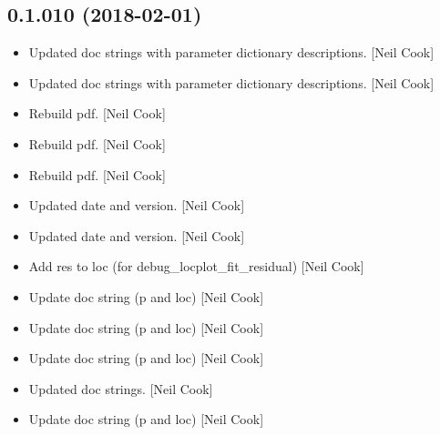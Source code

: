 \documentclass[a4paper,10pt,english]{report}
\begin{document}
\subsection{0.1.010 (2018-02-01)}
\label{\detokenize{misc/changelog:id492}}\begin{itemize}
\item {} 
Updated doc strings with parameter dictionary descriptions. {[}Neil
Cook{]}

\item {} 
Updated doc strings with parameter dictionary descriptions. {[}Neil
Cook{]}

\item {} 
Rebuild pdf. {[}Neil Cook{]}

\item {} 
Rebuild pdf. {[}Neil Cook{]}

\item {} 
Rebuild pdf. {[}Neil Cook{]}

\item {} 
Updated date and version. {[}Neil Cook{]}

\item {} 
Updated date and version. {[}Neil Cook{]}

\item {} 
Add res to loc (for debug\_locplot\_fit\_residual) {[}Neil Cook{]}

\item {} 
Update doc string (p and loc) {[}Neil Cook{]}

\item {} 
Update doc string (p and loc) {[}Neil Cook{]}

\item {} 
Update doc string (p and loc) {[}Neil Cook{]}

\item {} 
Updated doc strings. {[}Neil Cook{]}

\item {} 
Update doc string (p and loc) {[}Neil Cook{]}

\end{itemize}
\end{document}
